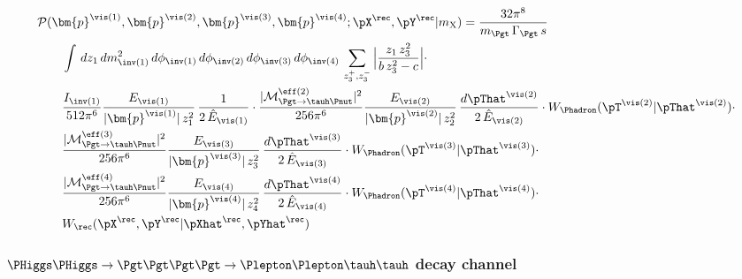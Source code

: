 \begin{align}
&
\mathcal{P}(\bm{p}^{\vis(1)},\bm{p}^{\vis(2)},\bm{p}^{\vis(3)},\bm{p}^{\vis(4)};\pX^{\rec},\pY^{\rec}|m_{\textrm{X}})
= \frac{32\pi^{8}}{m_{\Pgt} \, \Gamma_{\Pgt} \, s} \, \nonumber \\
& \qquad \int \, dz_{1} \, dm^{2}_{\inv(1)} \, d\phi_{\inv(1)} \, d\phi_{\inv(2)} \, d\phi_{\inv(3)} \, d\phi_{\inv(4)} \, 
  \sum_{z_{3}^{+},z_{3}^{-}} \, \Bigr\lvert \frac{z_{1} \, z_{3}^{2}}{b \, z_{3}^{2} - c} \Bigr\rvert \cdot \nonumber \\
& \qquad \frac{I_{\inv(1)}}{512\pi^{6}} 
  \frac{E_{\vis(1)}}{\vert\bm{p}^{\vis(1)}\vert \, z_{1}^{2}} \, \frac{1}{2 \, \hat{E}_{\vis(1)}} 
  \cdot \frac{\vert\mathcal{M}^{\eff(2)}_{\Pgt \to \tauh\Pnut}\vert^{2}}{256\pi^{6}} 
  \frac{E_{\vis(2)}}{\vert\bm{p}^{\vis(2)}\vert \, z_{2}^{2}} \, \frac{d\pThat^{\vis(2)}}{2 \, \hat{E}_{\vis(2)}} 
  \cdot W_{\Phadron}( \pT^{\vis(2)} | \pThat^{\vis(2)} ) \cdot \nonumber \\
& \qquad \frac{\vert\mathcal{M}^{\eff(3)}_{\Pgt \to \tauh\Pnut}\vert^{2}}{256\pi^{6}} 
  \frac{E_{\vis(3)}}{\vert\bm{p}^{\vis(3)}\vert \, z_{3}^{2}} \, \frac{d\pThat^{\vis(3)}}{2 \, \hat{E}_{\vis(3)}} 
  \cdot W_{\Phadron}( \pT^{\vis(3)} | \pThat^{\vis(3)} ) \cdot \nonumber \\
& \qquad \frac{\vert\mathcal{M}^{\eff(4)}_{\Pgt \to \tauh\Pnut}\vert^{2}}{256\pi^{6}} 
  \frac{E_{\vis(4)}}{\vert\bm{p}^{\vis(4)}\vert \, z_{4}^{2}} \, \frac{d\pThat^{\vis(4)}}{2 \, \hat{E}_{\vis(4)}} 
  \cdot W_{\Phadron}( \pT^{\vis(4)} | \pThat^{\vis(4)} ) \cdot \nonumber \\
& \qquad W_{\rec}( \pX^{\rec},\pY^{\rec} | \pXhat^{\rec},\pYhat^{\rec} ) 
\label{eq:likelihood_lththth}
\end{align}

\subsubsection{$\PHiggs\PHiggs \to \Pgt\Pgt\Pgt\Pgt \to \Plepton\Plepton\tauh\tauh$ decay channel}

